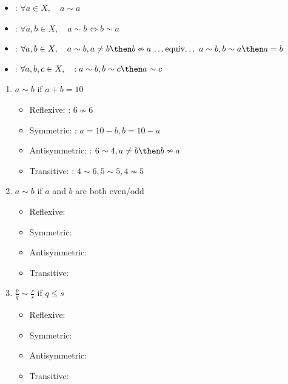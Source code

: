 \documentclass[basic, header]{nosvagor-notes}
\begin{document}
\begin{enumerate}[itemsep=5em]
\begin{itemize}
      \item
        :
        \(\forall a \in X, \quad a \sim a\)

      \item
        :
        \(\forall a,b \in X, \quad a \sim b \iff b \sim a \)

      \item
        :
        \(\forall a,b \in X, \quad a \sim b, a \neq b \then b \nsim a ~\text{\ldots equiv\ldots}~ a \sim b, b \sim a \then a = b\)

      \item
        :
        \(\forall a,b,c \in X, \quad : a \sim b, b \sim c \then a \sim c \)

    \end{itemize}
    \vspace{1em}

    \begin{enumerate}
      \item $a \sim b$ if $a + b = 10$
        \begin{itemize}
          \item Reflexive: : \(6 \nsim 6\)
          \item Symmetric: : \(a = 10 - b, b = 10 - a\)
          \item Antisymmetric: : \(6 \sim 4, a \neq b \then b \nsim a\)
          \item Transitive: : \(4 \sim 6, 5 \sim 5, 4 \nsim 5\)
        \end{itemize}

      \item $a \sim b$ if $a$ and $b$ are both even/odd
        \begin{itemize}
          \item Reflexive:
          \item Symmetric:
          \item Antisymmetric:
          \item Transitive:
        \end{itemize}

      \item $\frac p q \sim \frac r s$ if $q \le s$
        \begin{itemize}
          \item Reflexive:
          \item Symmetric:
          \item Antisymmetric:
          \item Transitive:
        \end{itemize}


\end{enumerate}
\end{enumerate}
\end{document}
